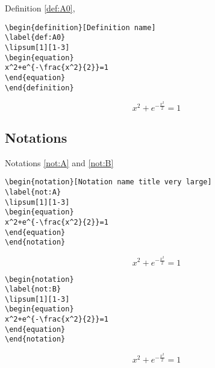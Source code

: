 Definition \ref{def:A0},

\begin{highlightbox}
\begin{verbatim}
\begin{definition}[Definition name]
\label{def:A0}
\lipsum[1][1-3]
\begin{equation}
x^2+e^{-\frac{x^2}{2}}=1
\end{equation}
\end{definition}
\end{verbatim}
\end{highlightbox}

\begin{definition}
\label{def:A0}
\lipsum[1][1-3]
\begin{equation}
x^2+e^{-\frac{x^2}{2}}=1
\end{equation}
\end{definition}




\subsection{Notations}

Notations \ref{not:A} and \ref{not:B}
\begin{highlightbox}
\begin{verbatim}
\begin{notation}[Notation name title very large]
\label{not:A}
\lipsum[1][1-3]
\begin{equation}
x^2+e^{-\frac{x^2}{2}}=1
\end{equation}
\end{notation}
\end{verbatim}
\end{highlightbox}
\begin{notation}
\label{not:A}
\lipsum[1][1-3]
\begin{equation}
x^2+e^{-\frac{x^2}{2}}=1
\end{equation}
\end{notation}

\begin{highlightbox}
\begin{verbatim}
\begin{notation}
\label{not:B}
\lipsum[1][1-3]
\begin{equation}
x^2+e^{-\frac{x^2}{2}}=1
\end{equation}
\end{notation}
\end{verbatim}
\end{highlightbox}
\begin{notation}
\label{not:B}
\lipsum[1][1-3]
\begin{equation}
x^2+e^{-\frac{x^2}{2}}=1
\end{equation}
\end{notation}






